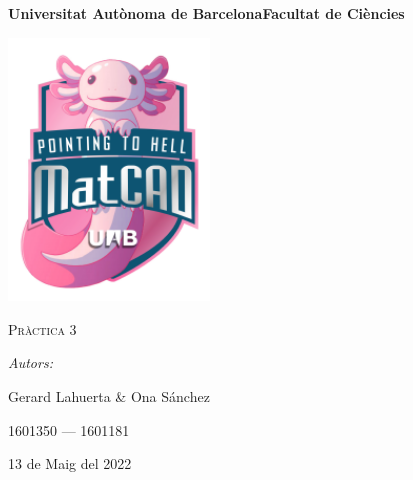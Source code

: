 \documentclass[a4paper, 11pt]{article}
\begin{document}
\begin{titlepage}
    \centering
    {\bfseries\LARGE \hspace{1.9em} Universitat Autònoma de Barcelona\newline Facultat de Ciències\par}
    \vspace{2cm}
    {\hspace{-1em}\includegraphics[width=0.4\textwidth]{logo.png}\par}
    \vspace{1cm}
    {\scshape\Huge Pràctica 3\par} 
    \vspace{1cm}
    {\Large \itshape Autors: \par}
    {\Large \hspace{-1.75em} Gerard Lahuerta \& Ona Sánchez \par}
    {\Large 1601350 --- 1601181 \par}
    \vspace{1cm}
    {\Large 13 de Maig del 2022\par}
\end{titlepage}

\justifying

\newpage
\setcounter{page}{2}
\pagestyle{plain}
\tableofcontents
\cleardoublepage
{}
\newpage
\end{document}
